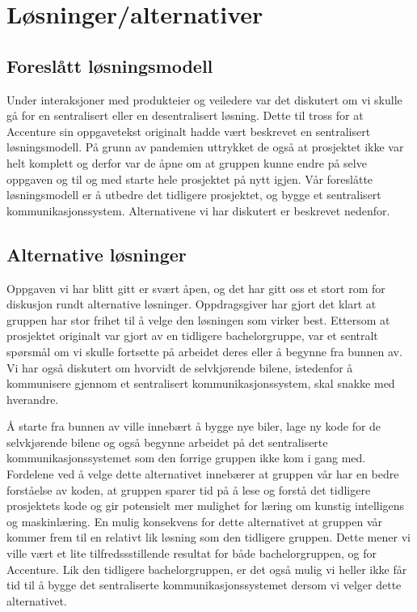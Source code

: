 \chapter{Løsninger/alternativer}

\section {Foreslått løsningsmodell}
Under interaksjoner med produkteier og veiledere var det diskutert om vi skulle gå for en sentralisert eller en desentralisert løsning. Dette til tross for at Accenture sin oppgavetekst originalt hadde vært beskrevet en sentralisert løsningsmodell. På grunn av pandemien uttrykket de også at prosjektet ikke var helt komplett og derfor var de åpne om at gruppen kunne endre på selve oppgaven og til og med starte hele prosjektet på nytt igjen. Vår foreslåtte løsningsmodell er å utbedre det tidligere prosjektet, og bygge et sentralisert kommunikasjonssystem. Alternativene vi har diskutert er beskrevet nedenfor. 

\section{Alternative løsninger}
Oppgaven vi har blitt gitt er svært åpen, og det har gitt oss et stort rom for diskusjon rundt alternative løsninger. Oppdragsgiver har gjort det klart at gruppen har stor frihet til å velge den løsningen som virker best. Ettersom at prosjektet originalt var gjort av en tidligere bachelorgruppe, var et sentralt spørsmål om vi skulle fortsette på arbeidet deres eller å begynne fra bunnen av. Vi har også diskutert om hvorvidt de selvkjørende bilene, istedenfor å kommunisere gjennom et sentralisert kommunikasjonssystem, skal snakke med hverandre.

Å starte fra bunnen av ville innebært å bygge nye biler, lage ny kode for de selvkjørende bilene og også begynne arbeidet på det sentraliserte kommunikasjonssystemet som den forrige gruppen ikke kom i gang med. Fordelene ved å velge dette alternativet innebærer at gruppen vår har en bedre forståelse av koden, at gruppen sparer tid på å lese og forstå det tidligere prosjektets kode og gir potensielt mer mulighet for læring om kunstig intelligens og maskinlæring. En mulig konsekvens for dette alternativet at gruppen vår kommer frem til en relativt lik løsning som den tidligere gruppen. Dette mener vi ville vært et lite tilfredssstillende resultat for både bachelorgruppen, og for Accenture. Lik den tidligere bachelorgruppen, er det også mulig vi heller ikke får tid til å bygge det sentraliserte kommunikasjonssystemet dersom vi velger dette alternativet.

